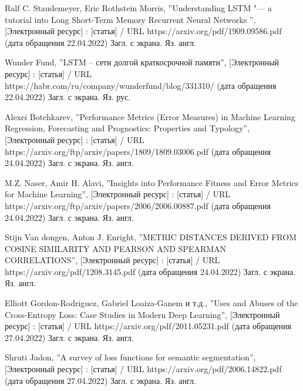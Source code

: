 \documentclass[bachelor, och, coursework]{SCWorks}
\begin{document}
\begin{thebibliography}{99}

     Ralf C. Staudemeyer, Eric Rothstein Morris, ''Understanding
    LSTM "--- a tutorial into Long Short-Term Memory Recurrent Neural Networks
    '', [Электронный ресурс] : [статья] / URL
    https://arxiv.org/pdf/1909.09586.pdf (дата обращения 22.04.2022) Загл. с
    экрана. Яз. англ.

     Wunder Fund, ''LSTM – сети долгой краткосрочной памяти'',
    [Электронный ресурс] : [статья] / URL
    https://habr.com/ru/company/wunderfund/blog/331310/ (дата обращения
    22.04.2022) Загл. с экрана. Яз. рус.


     Alexei Botchkarev, ''Performance Metrics (Error Measures)
    in Machine Learning Regression, Forecasting and Prognostics: Properties and
    Typology'', [Электронный ресурс] : [статья] / URL
    https://arxiv.org/ftp/arxiv/papers/1809/1809.03006.pdf (дата обращения
    24.04.2022) Загл. с экрана. Яз. англ.

     M.Z. Naser, Amir H. Alavi, ''Insights into Performance
    Fitness and Error Metrics for Machine Learning'', [Электронный ресурс] :
    [статья] / URL https://arxiv.org/ftp/arxiv/papers/2006/2006.00887.pdf (дата
    обращения 24.04.2022) Загл. с экрана. Яз. англ.

     Stijn Van dongen, Anton J. Enright, ''METRIC DISTANCES
    DERIVED FROM COSINE SIMILARITY AND PEARSON AND SPEARMAN CORRELATIONS'',
    [Электронный ресурс] : [статья] / URL https://arxiv.org/pdf/1208.3145.pdf
    (дата обращения 24.04.2022) Загл. с экрана. Яз. англ.


     Elliott Gordon-Rodriguez, Gabriel Loaiza-Ganem и т.д.,
    ''Uses and Abuses of the Cross-Entropy Loss: Case Studies in Modern Deep
    Learning'', [Электронный ресурс] : [статья] / URL
    https://arxiv.org/pdf/2011.05231.pdf (дата обращения 27.04.2022) Загл. с
    экрана. Яз. англ.

     Shruti Jadon, ''A survey of loss functions for semantic
    segmentation'', [Электронный ресурс] : [статья] / URL
    https://arxiv.org/pdf/2006.14822.pdf (дата обращения 27.04.2022) Загл. с
    экрана. Яз. англ.


\end{thebibliography}
\end{document}
